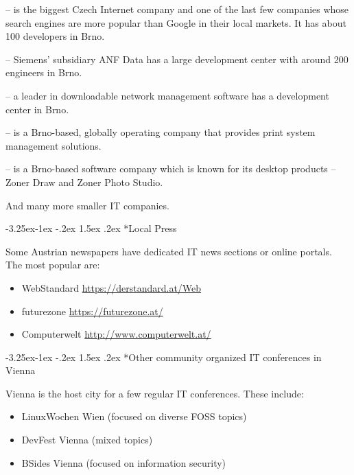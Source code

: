 \documentclass[10pt,a4paper]{article}
\makeatletter
\renewcommand\subsection{%
\@startsection{subsection}{2}{\z@}%
              {-3.25ex\@plus -1ex \@minus -.2ex}%
              {1.5ex \@plus .2ex}%
              {\color{kdelight}\sffamily\Large\bfseries}}
\makeatother
\begin{document}
\begin{description}
\item[\color{kdedarker} Seznam.cz] -- is the biggest Czech Internet company and one of the last few companies whose search engines are more popular than Google in their local markets. It has about 100 developers in Brno.
\item[\color{kdedarker} Siemens] -- Siemens' subsidiary ANF Data has a large development center with around 200 engineers in Brno.
\item[\color{kdedarker} Solar Winds] -- a leader in downloadable network management software has a development center in Brno.
\item[\color{kdedarker} Y Soft] -- is a Brno-based, globally operating company that provides print system management solutions.
\item[\color{kdedarker} ZONER software] -- is a Brno-based software company which is known for its desktop products -- Zoner Draw and Zoner Photo Studio.
\item And many more smaller IT companies.
\end{description}

\subsection*{Local Press}
Some Austrian newspapers have dedicated IT news sections or online portals. The most popular are:

\begin{itemize}
\item WebStandard \url{https://derstandard.at/Web}
\item futurezone \url{https://futurezone.at/}
\item Computerwelt \url{http://www.computerwelt.at/}
\end{itemize}


\subsection*{Other community organized IT conferences in Vienna}
Vienna is the host city for a few regular IT conferences. These include:

\begin{itemize}
	\item LinuxWochen Wien (focused on diverse FOSS topics)
	\item DevFest Vienna (mixed topics)
	\item BSides Vienna (focused on information security)
\end{itemize}
\end{document}
